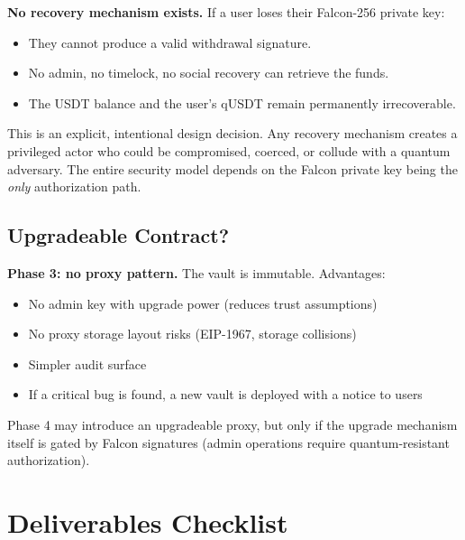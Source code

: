 \documentclass[11pt,a4paper]{article}
\begin{document}
\textbf{No recovery mechanism exists.} If a user loses their Falcon-256 private key:
\begin{itemize}
  \item They cannot produce a valid withdrawal signature.
  \item No admin, no timelock, no social recovery can retrieve the funds.
  \item The USDT balance and the user's qUSDT remain permanently irrecoverable.
\end{itemize}

This is an explicit, intentional design decision. Any recovery mechanism creates a privileged actor who could be compromised, coerced, or collude with a quantum adversary. The entire security model depends on the Falcon private key being the \textit{only} authorization path.

\subsection{Upgradeable Contract?}

\textbf{Phase 3: no proxy pattern.} The vault is immutable. Advantages:
\begin{itemize}
  \item No admin key with upgrade power (reduces trust assumptions)
  \item No proxy storage layout risks (EIP-1967, storage collisions)
  \item Simpler audit surface
  \item If a critical bug is found, a new vault is deployed with a notice to users
\end{itemize}

Phase 4 may introduce an upgradeable proxy, but only if the upgrade mechanism itself is gated by Falcon signatures (admin operations require quantum-resistant authorization).

\newpage
\section{Deliverables Checklist}
\end{document}
